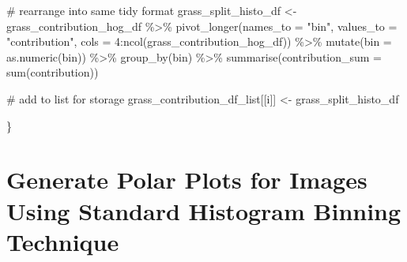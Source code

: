 \documentclass[
  letterpaper,
  DIV=11,
  numbers=noendperiod]{scrreprt}
\newenvironment{Shaded}{\begin{snugshade}}{\end{snugshade}}
\newcommand{\AttributeTok}[1]{\textcolor[rgb]{0.40,0.45,0.13}{#1}}
\newcommand{\CommentTok}[1]{\textcolor[rgb]{0.37,0.37,0.37}{#1}}
\newcommand{\DecValTok}[1]{\textcolor[rgb]{0.68,0.00,0.00}{#1}}
\newcommand{\FunctionTok}[1]{\textcolor[rgb]{0.28,0.35,0.67}{#1}}
\newcommand{\NormalTok}[1]{\textcolor[rgb]{0.00,0.23,0.31}{#1}}
\newcommand{\OtherTok}[1]{\textcolor[rgb]{0.00,0.23,0.31}{#1}}
\newcommand{\SpecialCharTok}[1]{\textcolor[rgb]{0.37,0.37,0.37}{#1}}
\newcommand{\StringTok}[1]{\textcolor[rgb]{0.13,0.47,0.30}{#1}}
\begin{document}
\begin{Shaded}
\begin{Highlighting}[]
    \CommentTok{\# rearrange into same tidy format}
\NormalTok{  grass\_split\_histo\_df }\OtherTok{\textless{}{-}} 
\NormalTok{    grass\_contribution\_hog\_df }\SpecialCharTok{\%\textgreater{}\%}
    \FunctionTok{pivot\_longer}\NormalTok{(}\AttributeTok{names\_to =} \StringTok{"bin"}\NormalTok{, }
                 \AttributeTok{values\_to =} \StringTok{"contribution"}\NormalTok{, }
                 \AttributeTok{cols =} \DecValTok{4}\SpecialCharTok{:}\FunctionTok{ncol}\NormalTok{(grass\_contribution\_hog\_df)) }\SpecialCharTok{\%\textgreater{}\%}
    \FunctionTok{mutate}\NormalTok{(}\AttributeTok{bin =} \FunctionTok{as.numeric}\NormalTok{(bin)) }\SpecialCharTok{\%\textgreater{}\%}
    \FunctionTok{group\_by}\NormalTok{(bin) }\SpecialCharTok{\%\textgreater{}\%}
    \FunctionTok{summarise}\NormalTok{(}\AttributeTok{contribution\_sum =} \FunctionTok{sum}\NormalTok{(contribution))}
  
  \CommentTok{\# add to list for storage}
\NormalTok{  grass\_contribution\_df\_list[[i]] }\OtherTok{\textless{}{-}}\NormalTok{ grass\_split\_histo\_df}

\NormalTok{\}}
\end{Highlighting}
\end{Shaded}

\section{Generate Polar Plots for Images Using Standard Histogram
Binning
Technique}\label{generate-polar-plots-for-images-using-standard-histogram-binning-technique-1}
\end{document}
